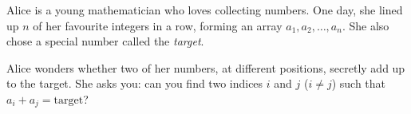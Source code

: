 Alice is a young mathematician who loves collecting numbers. One day, she lined up $n$ of her favourite integers in a row, forming an array $a_1, a_2, \ldots, a_n$. She also chose a special number called the \textit{target}.

Alice wonders whether two of her numbers, at different positions, secretly add up to the target. She asks you: can you find two indices $i$ and $j$ ($i \neq j$) such that $a_i + a_j = \text{target}$?
